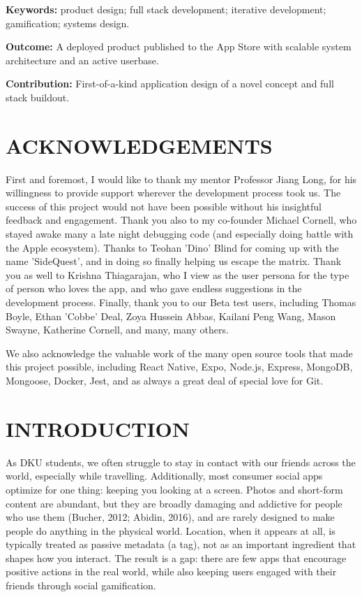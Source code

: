 \documentclass[12pt]{article}
\begin{document}
\textbf{Keywords:} product design; full stack development; iterative development; gamification; systems design.

\textbf{Outcome:} A deployed product published to the App Store with scalable system architecture and an active userbase.

\textbf{Contribution:} First-of-a-kind application design of a novel concept and full stack buildout.

\clearpage

\section{ACKNOWLEDGEMENTS}
First and foremost, I would like to thank my mentor Professor Jiang Long, for his willingness to provide support wherever the development process took us. The success of this project would not have been possible without his insightful feedback and engagement. Thank you also to my co-founder Michael Cornell, who stayed awake many a late night debugging code (and especially doing battle with the Apple ecosystem). Thanks to Teohan 'Dino' Blind for coming up with the name 'SideQuest', and in doing so finally helping us escape the matrix. Thank you as well to Krishna Thiagarajan, who I view as the user persona for the type of person who loves the app, and who gave endless suggestions in the development process. Finally, thank you to our Beta test users, including Thomas Boyle, Ethan 'Cobbe' Deal, Zoya Hussein Abbas, Kailani Peng Wang, Mason Swayne, Katherine Cornell, and many, many others.

We also acknowledge the valuable work of the many open source tools that made this project possible, including React Native, Expo, Node.js, Express, MongoDB, Mongoose, Docker, Jest, and as always a great deal of special love for Git.

\clearpage
\setcounter{tocdepth}{2}
\tableofcontents
\clearpage

\listoffigures
\clearpage
\clearpage
\setcounter{page}{1}
\renewcommand{\thepage}{\arabic{page}}
\section{INTRODUCTION}

As DKU students, we often struggle to stay in contact with our friends across the world, especially while travelling. Additionally, most consumer social apps optimize for one thing: keeping you looking at a screen. Photos and short-form content are abundant, but they are broadly damaging and addictive for people who use them (Bucher, 2012; Abidin, 2016), and are rarely designed to make people do anything in the physical world. Location, when it appears at all, is typically treated as passive metadata (a tag), not as an important ingredient that shapes how you interact. The result is a gap: there are few apps that encourage positive actions in the real world, while also keeping users engaged with their friends through social gamification.
\end{document}
